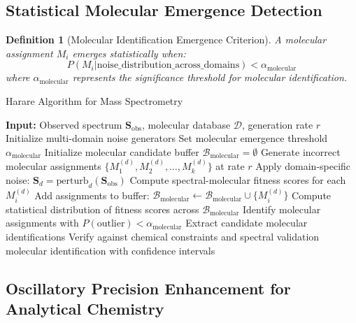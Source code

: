 \documentclass[11pt,a4paper]{article}
\newtheorem{definition}[theorem]{Definition}
\theoremstyle{remark}
\begin{document}
{\subsection{Statistical Molecular Emergence Detection}

\begin{definition}[Molecular Identification Emergence Criterion]
A molecular assignment $M_i$ emerges statistically when:
$$P(M_i | \text{noise\_distribution\_across\_domains}) < \alpha_{\text{molecular}}$$
where $\alpha_{\text{molecular}}$ represents the significance threshold for molecular identification.
\end{definition}

\begin{algorithm}[H]
\caption{Harare Algorithm for Mass Spectrometry}
\begin{algorithmic}[1]
\State \textbf{Input:} Observed spectrum $\mathbf{S}_{\text{obs}}$, molecular database $\mathcal{D}$, generation rate $r$
\State Initialize multi-domain noise generators
\State Set molecular emergence threshold $\alpha_{\text{molecular}}$
\State Initialize molecular candidate buffer $\mathcal{B}_{\text{molecular}} = \emptyset$
        \State Generate incorrect molecular assignments $\{M_1^{(d)}, M_2^{(d)}, \ldots, M_k^{(d)}\}$ at rate $r$
        \State Apply domain-specific noise: $\mathbf{S}_d = \text{perturb}_d(\mathbf{S}_{\text{obs}})$
        \State Compute spectral-molecular fitness scores for each $M_i^{(d)}$
        \State Add assignments to buffer: $\mathcal{B}_{\text{molecular}} \leftarrow \mathcal{B}_{\text{molecular}} \cup \{M_i^{(d)}\}$
    \EndFor
    \State Compute statistical distribution of fitness scores across $\mathcal{B}_{\text{molecular}}$
    \State Identify molecular assignments with $P(\text{outlier}) < \alpha_{\text{molecular}}$
        \State Extract candidate molecular identifications
        \State Verify against chemical constraints and spectral validation
            \Return molecular identification with confidence intervals
        \EndIf
    \EndIf
\EndWhile
\end{algorithmic}
\end{algorithm}

\subsection{Oscillatory Precision Enhancement for Analytical Chemistry}

}
\end{document}
